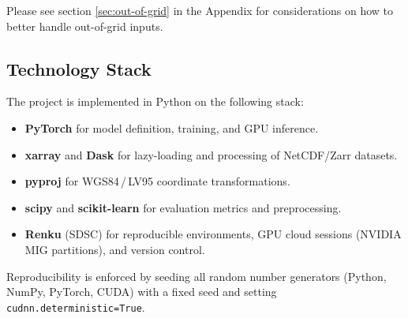 Please see section \ref{sec:out-of-grid} in the Appendix for considerations on how to better handle out-of-grid inputs.

\subsection{Technology Stack}

The project is implemented in Python on the following stack:

\begin{itemize}
    \item \textbf{PyTorch} for model definition, training, and GPU inference.
    \item \textbf{xarray} and \textbf{Dask} for lazy-loading and processing of NetCDF/Zarr datasets.
    \item \textbf{pyproj} for WGS84\,/\,LV95 coordinate transformations.
    \item \textbf{scipy} and \textbf{scikit-learn} for evaluation metrics and preprocessing.
    \item \textbf{Renku} \citep{renku} (SDSC) for reproducible environments, GPU cloud sessions (NVIDIA MIG partitions), and version control.
\end{itemize}

Reproducibility is enforced by seeding all random number generators (Python, NumPy, PyTorch, CUDA) with a fixed seed and setting \texttt{cudnn.deterministic=True}.